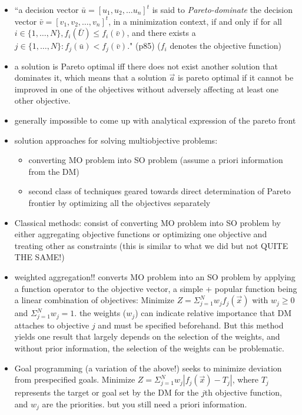 \documentclass{article}
\begin{document}
\begin{itemize}
\item ``a decision vector $\bar{u} = [u_1, u_2, \dots u_n]^t$ is said to \textit{Pareto-dominate} the decision vector $\bar{v} = [v_1,v_2, \dots, v_n]^t$, in a minimization context, if and only if for all $i \in \{1,\dots,N\}, f_i(\bar{U}) \leq f_i(\bar{v})$, and there exists a $j\in\{1,\dots,N\}: f_j(\bar{u}) < f_j(\bar{v})$." (p85) ($f_i$ denotes the objective function)
\item a solution is Pareto optimal iff there does not exist another solution that dominates it, which means that a solution $\overrightarrow{a}$ is pareto optimal if it cannot be improved in one of the objectives without adversely affecting at least one other objective. 
\item generally impossible to come up with analytical expression of the pareto front
\item solution approaches for solving multiobjective problems:
	\begin{itemize}
	\item converting MO problem into SO problem (assume a priori information from the DM)
	\item second class of techniques geared towards direct determination of Pareto frontier by optimizing all the objectives separately
	\end{itemize}
\item Classical methods: consist of converting MO problem into SO problem by either aggregating objective functions or optimizing one objective and treating other as constraints (this is similar to what we did but not QUITE THE SAME!)
\item weighted aggregation!! converts MO problem into an SO problem by applying a function operator to the objective vector, a simple + popular function being a linear combination of objectives: Minimize $Z = \Sigma_{j=1}^N w_jf_j(\overrightarrow{x})$ with $w_j \geq 0$ and $\Sigma_{j=1}^N w_j = 1$. the weights ($w_j$) can indicate relative importance that DM attaches to objective $j$ and must be specified beforehand. But this method yields one result that largely depends on the selection of the weights, and without prior information, the selection of the weights can be problematic.
\item Goal programming (a variation of the above!) seeks to minimize deviation from prespecified goals. Minimize $Z = \Sigma_{j=1}^N w_j |f_j(\overrightarrow{x})- T_j|$, where $T_j$ represents the target or goal set by the DM for the $j$th objective function, and $w_j$ are the priorities. but you still need a priori information.

\end{itemize}
\end{document}
